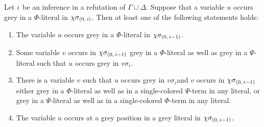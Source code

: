 \documentclass[,%
	draft=false,%
	numbers=noendperiod
	12pt,
	a4paper,
	oneside,%
	openany,
]{memoir}
\begin{document}
\begin{lemma}
	\label{lemma:var_grey_col_lit}
	Let $\iota$ be an inference in a refutation of $\Gamma\cup\Delta$.
	Suppose that a variable $u$ occurs grey in a $\Phi$-literal in $\chi\sigma_{(0,\,i)}$.
	Then at least one of the following statements holds:
	\begin{enumerate}
		\item
			\label{14_1}
			The variable $u$ occurs grey in a $\Phi$-literal in $\chi\sigma_{(0,\,i-1)}$.

		\item 
			\label{14_2}
			Some variable $v$ occurs in $\chi\sigma_{(0,\,i-1)}$ grey in a $\Phi$-literal as well as grey in a $\Psi$-literal such that $u$ occurs grey in $v\sigma_i$.

		\item 
			\label{14_3}
			There is a variable $v$ such that $u$ occurs grey in $v\sigma_i$\footnotemark and $v$ occurs in $\chi\sigma_{(0,\,i-1)}$
			either grey in a $\Phi$-literal as well as in a single-colored $\Psi$-term in any literal, 
			or grey in a $\Psi$-literal as well as in a single-colored $\Phi$-term in any literal.

		\item
			\label{14_4}
			The variable $u$ occurs at a grey position in a grey literal in $\chi\sigma_{(0,\,i-1)}$.

	\end{enumerate}
\end{lemma}
\end{document}
